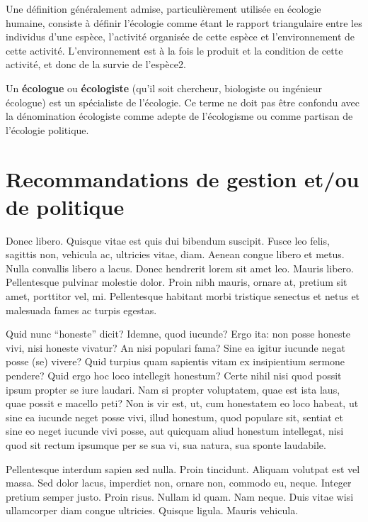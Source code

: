 \documentclass[twoside]{extreport}
\begin{document}
Une définition généralement admise, particulièrement utilisée en
écologie humaine, consiste à définir l'écologie comme étant le rapport
triangulaire entre les individus d'une espèce, l'activité organisée de
cette espèce et l'environnement de cette activité. L'environnement est à
la fois le produit et la condition de cette activité, et donc de la
survie de l'espèce2.

Un \textbf{écologue} ou \textbf{écologiste} (qu'il soit chercheur,
biologiste ou ingénieur écologue) est un spécialiste de l'écologie. Ce
terme ne doit pas être confondu avec la dénomination écologiste comme
adepte de l'écologisme ou comme partisan de l'écologie politique.

\hypertarget{recommandations-de-gestion-etou-de-politique}{%
\chapter*{Recommandations de gestion et/ou de
politique}\label{recommandations-de-gestion-etou-de-politique}}

Donec libero. Quisque vitae est quis dui bibendum suscipit. Fusce leo
felis, sagittis non, vehicula ac, ultricies vitae, diam. Aenean congue
libero et metus. Nulla convallis libero a lacus. Donec hendrerit lorem
sit amet leo. Mauris libero. Pellentesque pulvinar molestie dolor. Proin
nibh mauris, ornare at, pretium sit amet, porttitor vel, mi.
Pellentesque habitant morbi tristique senectus et netus et malesuada
fames ac turpis egestas.

Quid nunc ``honeste'' dicit? Idemne, quod iucunde? Ergo ita: non posse
honeste vivi, nisi honeste vivatur? An nisi populari fama? Sine ea
igitur iucunde negat posse (se) vivere? Quid turpius quam sapientis
vitam ex insipientium sermone pendere? Quid ergo hoc loco intellegit
honestum? Certe nihil nisi quod possit ipsum propter se iure laudari.
Nam si propter voluptatem, quae est ista laus, quae possit e macello
peti? Non is vir est, ut, cum honestatem eo loco habeat, ut sine ea
iucunde neget posse vivi, illud honestum, quod populare sit, sentiat et
sine eo neget iucunde vivi posse, aut quicquam aliud honestum
intellegat, nisi quod sit rectum ipsumque per se sua vi, sua natura, sua
sponte laudabile.

Pellentesque interdum sapien sed nulla. Proin tincidunt. Aliquam
volutpat est vel massa. Sed dolor lacus, imperdiet non, ornare non,
commodo eu, neque. Integer pretium semper justo. Proin risus. Nullam id
quam. Nam neque. Duis vitae wisi ullamcorper diam congue ultricies.
Quisque ligula. Mauris vehicula.
\end{document}
